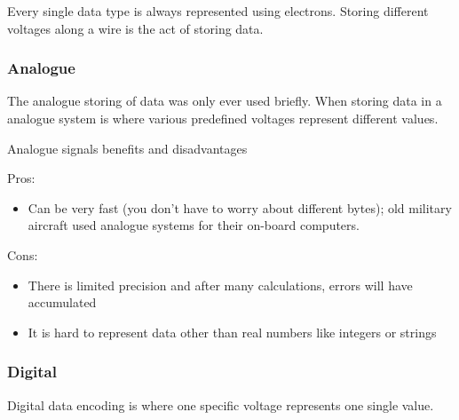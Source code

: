Every single data type is always represented using electrons.
Storing different voltages along a wire is the act of storing data.

\subsubsection{Analogue}\label{ssub:analogue}

The analogue storing of data was only ever used briefly.
When storing data in a analogue system is where various predefined voltages represent different values.

\medskip
\begin{highlight}{Analogue signals benefits and disadvantages}
    \begin{minipage}[t]{0.45\linewidth}
        Pros:
        \begin{itemize}
            \item Can be very fast (you don't have to worry about different bytes); old military aircraft used analogue systems for their on-board computers.
        \end{itemize}
    \end{minipage}
    \hfill
    \begin{minipage}[t]{0.45\linewidth}
        Cons:
        \begin{itemize}
            \item There is limited precision and after many calculations, errors will have accumulated
            \item It is hard to represent data other than real numbers like integers or strings
        \end{itemize}
    \end{minipage}
\end{highlight}

\subsubsection{Digital}\label{ssub:digital}

Digital data encoding is where one specific voltage represents one single value.

